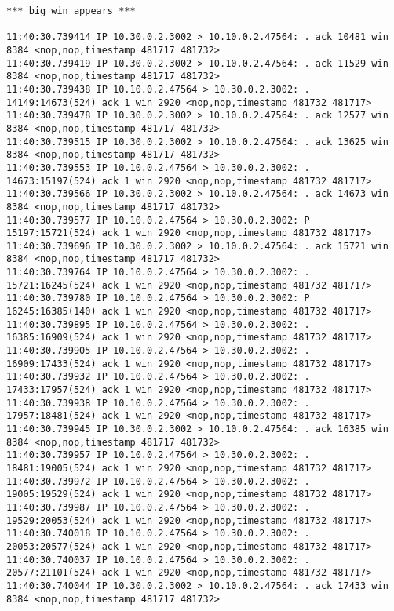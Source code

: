 \documentclass[a4paper,12pt]{article}
\begin{document}
\begin{lstlisting}
*** big win appears ***

11:40:30.739414 IP 10.30.0.2.3002 > 10.10.0.2.47564: . ack 10481 win 8384 <nop,nop,timestamp 481717 481732>
11:40:30.739419 IP 10.30.0.2.3002 > 10.10.0.2.47564: . ack 11529 win 8384 <nop,nop,timestamp 481717 481732>
11:40:30.739438 IP 10.10.0.2.47564 > 10.30.0.2.3002: . 14149:14673(524) ack 1 win 2920 <nop,nop,timestamp 481732 481717>
11:40:30.739478 IP 10.30.0.2.3002 > 10.10.0.2.47564: . ack 12577 win 8384 <nop,nop,timestamp 481717 481732>
11:40:30.739515 IP 10.30.0.2.3002 > 10.10.0.2.47564: . ack 13625 win 8384 <nop,nop,timestamp 481717 481732>
11:40:30.739553 IP 10.10.0.2.47564 > 10.30.0.2.3002: . 14673:15197(524) ack 1 win 2920 <nop,nop,timestamp 481732 481717>
11:40:30.739566 IP 10.30.0.2.3002 > 10.10.0.2.47564: . ack 14673 win 8384 <nop,nop,timestamp 481717 481732>
11:40:30.739577 IP 10.10.0.2.47564 > 10.30.0.2.3002: P 15197:15721(524) ack 1 win 2920 <nop,nop,timestamp 481732 481717>
11:40:30.739696 IP 10.30.0.2.3002 > 10.10.0.2.47564: . ack 15721 win 8384 <nop,nop,timestamp 481717 481732>
11:40:30.739764 IP 10.10.0.2.47564 > 10.30.0.2.3002: . 15721:16245(524) ack 1 win 2920 <nop,nop,timestamp 481732 481717>
11:40:30.739780 IP 10.10.0.2.47564 > 10.30.0.2.3002: P 16245:16385(140) ack 1 win 2920 <nop,nop,timestamp 481732 481717>
11:40:30.739895 IP 10.10.0.2.47564 > 10.30.0.2.3002: . 16385:16909(524) ack 1 win 2920 <nop,nop,timestamp 481732 481717>
11:40:30.739905 IP 10.10.0.2.47564 > 10.30.0.2.3002: . 16909:17433(524) ack 1 win 2920 <nop,nop,timestamp 481732 481717>
11:40:30.739932 IP 10.10.0.2.47564 > 10.30.0.2.3002: . 17433:17957(524) ack 1 win 2920 <nop,nop,timestamp 481732 481717>
11:40:30.739938 IP 10.10.0.2.47564 > 10.30.0.2.3002: . 17957:18481(524) ack 1 win 2920 <nop,nop,timestamp 481732 481717>
11:40:30.739945 IP 10.30.0.2.3002 > 10.10.0.2.47564: . ack 16385 win 8384 <nop,nop,timestamp 481717 481732>
11:40:30.739957 IP 10.10.0.2.47564 > 10.30.0.2.3002: . 18481:19005(524) ack 1 win 2920 <nop,nop,timestamp 481732 481717>
11:40:30.739972 IP 10.10.0.2.47564 > 10.30.0.2.3002: . 19005:19529(524) ack 1 win 2920 <nop,nop,timestamp 481732 481717>
11:40:30.739987 IP 10.10.0.2.47564 > 10.30.0.2.3002: . 19529:20053(524) ack 1 win 2920 <nop,nop,timestamp 481732 481717>
11:40:30.740018 IP 10.10.0.2.47564 > 10.30.0.2.3002: . 20053:20577(524) ack 1 win 2920 <nop,nop,timestamp 481732 481717>
11:40:30.740037 IP 10.10.0.2.47564 > 10.30.0.2.3002: . 20577:21101(524) ack 1 win 2920 <nop,nop,timestamp 481732 481717>
11:40:30.740044 IP 10.30.0.2.3002 > 10.10.0.2.47564: . ack 17433 win 8384 <nop,nop,timestamp 481717 481732>

\end{lstlisting}
\end{document}
